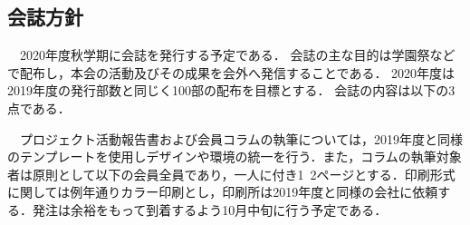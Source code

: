 \subsection*{会誌方針}
　2020年度秋学期に会誌を発行する予定である．
会誌の主な目的は学園祭などで配布し，本会の活動及びその成果を会外へ発信することである．
2020年度は2019年度の発行部数と同じく100部の配布を目標とする．
会誌の内容は以下の3点である．
\begin{itemize}
\end{itemize}
　プロジェクト活動報告書および会員コラムの執筆については，2019年度と同様のテンプレートを使用しデザインや環境の統一を行う．また，コラムの執筆対象者は原則として\thirdGrade{}以下の会員全員であり，一人に付き1~2ページとする．印刷形式に関しては例年通りカラー印刷とし，印刷所は2019年度と同様の会社に依頼する．発注は余裕をもって到着するよう10月中旬に行う予定である．

